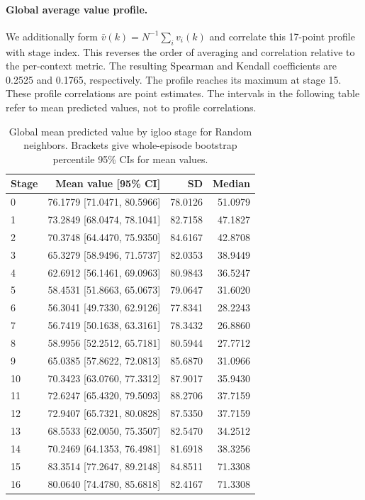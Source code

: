 \paragraph{Global average value profile.}
We additionally form $\bar v(k)=N^{-1}\sum_i v_i(k)$ and correlate this 17-point profile with stage index. This reverses the order of averaging and correlation relative to the per-context metric. The resulting Spearman and Kendall coefficients are 0.2525 and 0.1765, respectively. The profile reaches its maximum at stage 15. These profile correlations are point estimates. The intervals in the following table refer to mean predicted values, not to profile correlations.

\begin{table}[!htbp]
\centering
\small
\caption{Global mean predicted value by igloo stage for Random neighbors. Brackets give whole-episode bootstrap percentile 95\% CIs for mean values.}
\label{tab:random11010_profile}
\begin{tabular}{lrrr}
\toprule
Stage & Mean value [95\% CI] & SD & Median \\
\midrule
0 & 76.1779 [71.0471, 80.5966] & 78.0126 & 51.0979 \\
1 & 73.2849 [68.0474, 78.1041] & 82.7158 & 47.1827 \\
2 & 70.3748 [64.4470, 75.9350] & 84.6167 & 42.8708 \\
3 & 65.3279 [58.9496, 71.5737] & 82.0353 & 38.9449 \\
4 & 62.6912 [56.1461, 69.0963] & 80.9843 & 36.5247 \\
5 & 58.4531 [51.8663, 65.0673] & 79.0647 & 31.6020 \\
6 & 56.3041 [49.7330, 62.9126] & 77.8341 & 28.2243 \\
7 & 56.7419 [50.1638, 63.3161] & 78.3432 & 26.8860 \\
8 & 58.9956 [52.2512, 65.7181] & 80.5944 & 27.7712 \\
9 & 65.0385 [57.8622, 72.0813] & 85.6870 & 31.0966 \\
10 & 70.3423 [63.0760, 77.3312] & 87.9017 & 35.9430 \\
11 & 72.6247 [65.4320, 79.5093] & 88.2706 & 37.7159 \\
12 & 72.9407 [65.7321, 80.0828] & 87.5350 & 37.7159 \\
13 & 68.5533 [62.0050, 75.3507] & 82.5470 & 34.2512 \\
14 & 70.2469 [64.1353, 76.4981] & 81.6918 & 38.3256 \\
15 & 83.3514 [77.2647, 89.2148] & 84.8511 & 71.3308 \\
16 & 80.0640 [74.4780, 85.6818] & 82.4167 & 71.3308 \\
\bottomrule
\end{tabular}
\end{table}

